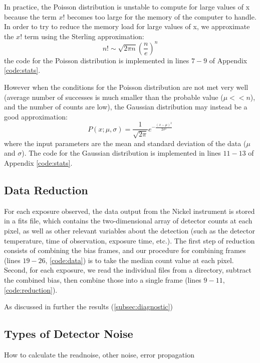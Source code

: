 \documentclass[preprint]{aastex62}
\begin{document}
In practice, the Poisson distribution is unstable to compute for large values of x because the term $x!$ becomes too large for the memory of the computer to handle. In order to try to reduce the memory load for large values of x, we approximate the $x!$ term using the Sterling approximation:
\begin{equation}
n! \sim \sqrt{2\pi n}\left(\frac{n}{e} \right)^n
\end{equation}
the code for the Poisson distribution is implemented in lines $7-9$ of Appendix \ref{code:stats}.

However when the conditions for the Poisson distribution are not met very well (average number of successes is much smaller than the probable value ($\mu << n$), and the number of counts are low), the Gaussian distribution may instead be a good approximation:
\begin{equation}
P(x; \mu, \sigma) = \frac{1}{\sqrt{2\pi}} e^{-\frac{(x-\mu)^2}{2\sigma^2}}
\end{equation}
where the input parameters are the mean and standard deviation of the data ($\mu$ and $\sigma$). The code for the Gaussian distribution is implemented in lines $11-13$ of Appendix \ref{code:stats}. 

\subsection{Data Reduction} \label{sec:reduction}
For each exposure observed, the data output from the Nickel instrument is stored in a fits file, which contains the two-dimensional array of detector counts at each pixel, as well as other relevant variables about the detection (such as the detector temperature, time of observation, exposure time, etc.). The first step of reduction consists of combining the bias frames, and our procedure for combining frames (lines $19-26$, \ref{code:data}) is to take the median count value at each pixel. Second, for each exposure, we read the individual files from a directory, subtract the combined bias, then combine those into a single frame (lines $9-11$, \ref{code:reduction}).

As discussed in further the results (\ref{subsec:diagnostic})

\subsection{Types of Detector Noise} \label{subsec:noise}
How to calculate the readnoise, other noise, error propagation
\end{document}
